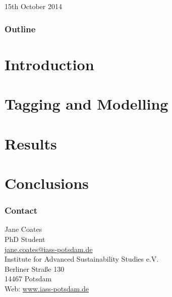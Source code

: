 \documentclass[center]{beamer}
\begin{document}


\begin{frame} %
    \vspace{3cm}
    {\Large \textcolor{\highlightcolor}{\textbf{\slidesettitle}}}\\ 
    \vspace{1cm}
    {\Large \textcolor{GreyIASS}{\textbf{\authorname}}} \\
    \vspace{.5cm}
    {\large \textcolor{GreyIASS}{15th October 2014}} 
\end{frame}



\begin{frame}
    \frametitle{Outline}
    \tableofcontents 
\end{frame}
\centering
\section{Introduction}


\section{Tagging and Modelling}
 

\section{Results}


\section{Conclusions}


\begin{frame} %
    \frametitle{Contact}

    \begin{flushleft}
        \textcolor{BlueIASS} {
            Jane Coates\\
            PhD Student\\
            \href{mailto:jane.coates@iass-potsdam.de}{jane.coates@iass-potsdam.de} \\ \vspace{5mm}
            Institute for Advanced Sustainability Studies e.V. \\
            Berliner Stra{\ss}e 130 \\
            14467 Potsdam \\
            Web: \url{www.iass-potsdam.de}
        }
    \end{flushleft}

\end{frame}

% 
\end{document}
